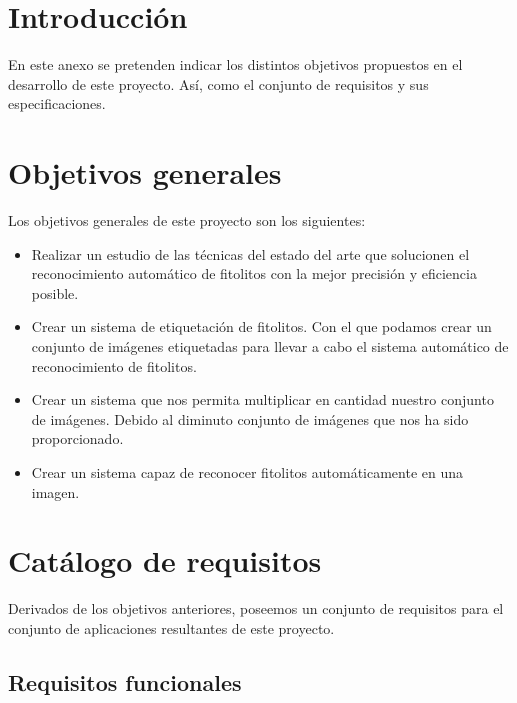 
\section{Introducción}
En este anexo se pretenden indicar los distintos objetivos propuestos en el desarrollo de este proyecto. Así, como el conjunto de requisitos y sus especificaciones.

\section{Objetivos generales}
Los objetivos generales de este proyecto son los siguientes:

\begin{itemize}
	\item Realizar un estudio de las técnicas del estado del arte que solucionen el
reconocimiento automático de fitolitos con la mejor precisión y eficiencia posible. 
	\item Crear un sistema de etiquetación de fitolitos. Con el que podamos crear un conjunto de imágenes etiquetadas para llevar a cabo el sistema automático de reconocimiento de fitolitos.
	\item Crear un sistema que nos permita multiplicar en cantidad nuestro conjunto de imágenes. Debido al diminuto conjunto de imágenes que nos ha sido proporcionado.
	\item Crear un sistema capaz de reconocer fitolitos automáticamente en una imagen.
\end{itemize}

\section{Catálogo de requisitos}
Derivados de los objetivos anteriores, poseemos un conjunto de requisitos para el conjunto de aplicaciones resultantes de este proyecto.

\subsection{Requisitos funcionales}

